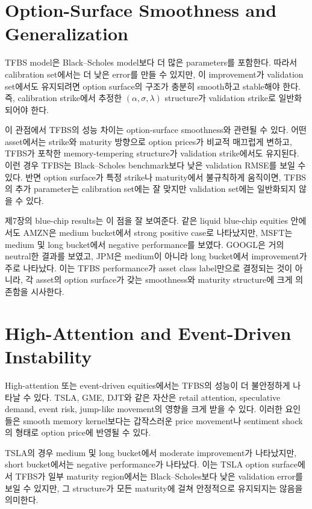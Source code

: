 \documentclass[11pt,a4paper]{report}
\begin{document}
\section{Option-Surface Smoothness and Generalization}

TFBS model은 Black--Scholes model보다 더 많은 parameters를 포함한다. 따라서 calibration set에서는 더 낮은 error를 만들 수 있지만, 이 improvement가 validation set에서도 유지되려면 option surface의 구조가 충분히 smooth하고 stable해야 한다. 즉, calibration strike에서 추정한 \((\alpha,\sigma,\lambda)\) structure가 validation strike로 일반화되어야 한다.

이 관점에서 TFBS의 성능 차이는 option-surface smoothness와 관련될 수 있다. 어떤 asset에서는 strike와 maturity 방향으로 option prices가 비교적 매끄럽게 변하고, TFBS가 포착한 memory-tempering structure가 validation strike에서도 유지된다. 이런 경우 TFBS는 Black--Scholes benchmark보다 낮은 validation RMSE를 보일 수 있다. 반면 option surface가 특정 strike나 maturity에서 불규칙하게 움직이면, TFBS의 추가 parameter는 calibration set에는 잘 맞지만 validation set에는 일반화되지 않을 수 있다.

제7장의 blue-chip results는 이 점을 잘 보여준다. 같은 liquid blue-chip equities 안에서도 AMZN은 medium bucket에서 strong positive case로 나타났지만, MSFT는 medium 및 long bucket에서 negative performance를 보였다. GOOGL은 거의 neutral한 결과를 보였고, JPM은 medium이 아니라 long bucket에서 improvement가 주로 나타났다. 이는 TFBS performance가 asset class label만으로 결정되는 것이 아니라, 각 asset의 option surface가 갖는 smoothness와 maturity structure에 크게 의존함을 시사한다.

\section{High-Attention and Event-Driven Instability}

High-attention 또는 event-driven equities에서는 TFBS의 성능이 더 불안정하게 나타날 수 있다. TSLA, GME, DJT와 같은 자산은 retail attention, speculative demand, event risk, jump-like movement의 영향을 크게 받을 수 있다. 이러한 요인들은 smooth memory kernel보다는 갑작스러운 price movement나 sentiment shock의 형태로 option price에 반영될 수 있다.

TSLA의 경우 medium 및 long bucket에서 moderate improvement가 나타났지만, short bucket에서는 negative performance가 나타났다. 이는 TSLA option surface에서 TFBS가 일부 maturity region에서는 Black--Scholes보다 낮은 validation error를 보일 수 있지만, 그 structure가 모든 maturity에 걸쳐 안정적으로 유지되지는 않음을 의미한다.
\end{document}
